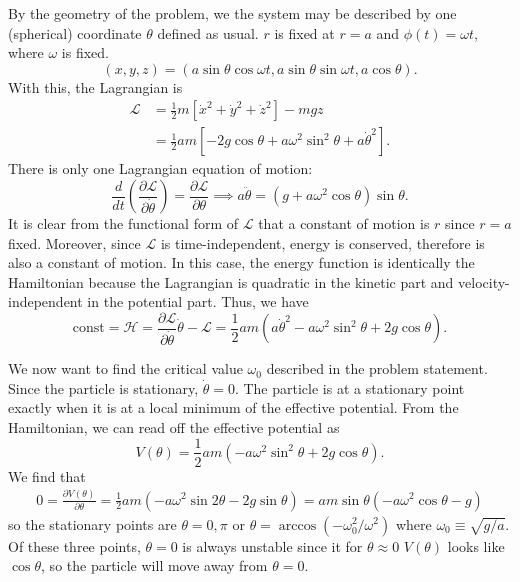 \documentclass{article}
\theoremstyle{definition}
\newcommand{\p}{\partial}
\newcommand{\lag}{\mathcal{L}}
\newcommand{\ham}{\mathcal{H}}
\newcommand{\f}[2]{\frac{#1}{#2}}
\newcommand{\lp}{\left(}
\newcommand{\rp}{\right)}
\newcommand{\lb}{\left[}
\newcommand{\rb}{\right]}
\begin{document}
\noindent By the geometry of the problem, we the system may be described by one (spherical) coordinate $\theta$ defined as usual. $r$ is fixed at $r=a$ and $\phi(t) = \omega t$, where $\omega$ is fixed.
\begin{equation*}
(x,y,z) = (a\sin\theta \cos\omega t, a\sin\theta\sin\omega t, a\cos\theta).
\end{equation*}
With this, the Lagrangian is 
\begin{align*}
\lag 
&= \f{1}{2}m \lb \dot{x}^2 + \dot{y}^2 + \dot{z}^2\rb - mgz\\
&= \f{1}{2} am \lb -2g\cos\theta + a\omega^2\sin^2\theta  + a\dot{\theta}^2 \rb.
\end{align*}
There is only one Lagrangian equation of motion:
\begin{equation*}
\f{d}{dt}\lp \f{\p \lag}{\p \dot\theta} \rp = \f{\p \lag}{\p \theta} \implies a \ddot{\theta} =  \lp g + a\omega^2 \cos\theta \rp\sin\theta.
\end{equation*}
It is clear from the functional form of $\lag$ that a constant of motion is $r$ since $r=a$ fixed. Moreover, since $\lag$ is time-independent, energy is conserved, therefore is also a constant of motion. In this case, the energy function is identically the Hamiltonian because the Lagrangian is quadratic in the kinetic part and velocity-independent in the potential part. Thus, we have
\begin{equation*}
\text{const} = \ham = \f{\p \lag}{\p \dot\theta}\dot\theta - \lag = \frac{1}{2} a m \left(a \dot\theta^2-a \omega^2 \sin^2\theta+2 g \cos\theta\right).
\end{equation*}


We now want to find the critical value $\omega_0$ described in the problem statement. Since the particle is stationary, $\dot{\theta} = 0$. The particle is at a stationary point exactly when it is at a local minimum of the effective potential. From the Hamiltonian, we can read off the effective potential as 
\begin{equation*}
V(\theta) = \f{1}{2}am\lp -a\omega^2\sin^2\theta + 2g\cos\theta \rp.
\end{equation*}
We find that 
\begin{align*}
0 = \f{\p V(\theta)}{\p \theta} = \f{1}{2}am\lp -a\omega^2\sin 2\theta -2g\sin\theta \rp = am\sin\theta \lp -a\omega^2\cos\theta - g  \rp 
\end{align*}
so the stationary points are $\theta = 0, \pi$ or $\theta = \arccos(-\omega_0^2/\omega^2)$ where $\boxed{\omega_0 \equiv \sqrt{g/a}}$. Of these three points, $\theta=0$ is always unstable since it for $\theta\approx 0$ $V(\theta)$ looks like $\cos\theta$, so the particle will move away from $\theta=0$. \\
\end{document}
